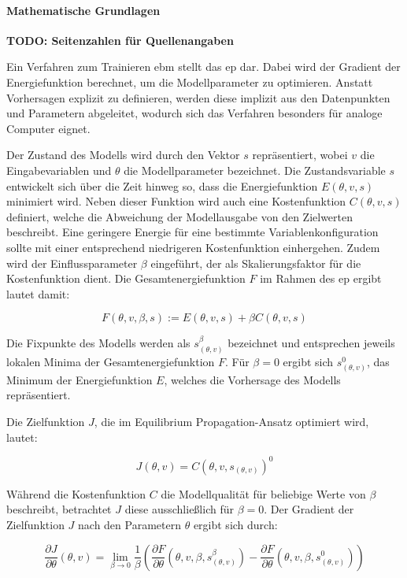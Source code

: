 \paragraph{Mathematische Grundlagen}

\textbf{TODO: Seitenzahlen für Quellenangaben}

Ein Verfahren zum Trainieren \ac{ebm} stellt das \ac{ep} dar. Dabei wird der Gradient der Energiefunktion berechnet, um die Modellparameter zu optimieren. Anstatt Vorhersagen explizit zu definieren, werden diese implizit aus den Datenpunkten und Parametern abgeleitet, wodurch sich das Verfahren besonders für analoge Computer eignet. \cite{Scellier2017}

Der Zustand des Modells wird durch den Vektor \(s\) repräsentiert, wobei \(v\) die Eingabevariablen und \(\theta\) die Modellparameter bezeichnet. Die Zustandsvariable \(s\) entwickelt sich über die Zeit hinweg so, dass die Energiefunktion \(E(\theta,v,s)\) minimiert wird. Neben dieser Funktion wird auch eine Kostenfunktion \(C(\theta,v,s)\) definiert, welche die Abweichung der Modellausgabe von den Zielwerten beschreibt. Eine geringere Energie für eine bestimmte Variablenkonfiguration sollte mit einer entsprechend niedrigeren Kostenfunktion einhergehen. Zudem wird der Einflussparameter \(\beta\) eingeführt, der als Skalierungsfaktor für die Kostenfunktion dient. Die Gesamtenergiefunktion \(F\) im Rahmen des \ac{ep} ergibt lautet damit:

\[F(\theta,v,\beta,s):=E(\theta,v,s)+\beta C(\theta,v,s)\]

Die Fixpunkte des Modells werden als \(s_{(\theta,v)}^\beta\) bezeichnet und entsprechen jeweils lokalen Minima der Gesamtenergiefunktion \(F\). Für \(\beta=0\) ergibt sich \(s_{(\theta,v)}^0\), das Minimum der Energiefunktion \(E\), welches die Vorhersage des Modells repräsentiert. \cite{Scellier2017}

Die Zielfunktion \(J\), die im Equilibrium Propagation-Ansatz optimiert wird, lautet:

\[J(\theta,v)=C(\theta,v,s_{(\theta,v)})^0\]

Während die Kostenfunktion \(C\) die Modellqualität für beliebige Werte von \(\beta\) beschreibt, betrachtet \(J\) diese ausschließlich für \(\beta=0\). Der Gradient der Zielfunktion \(J\) nach den Parametern \(\theta\) ergibt sich durch:

\[\frac{\partial J}{\partial \theta}(\theta,v)=\lim\limits_{\beta \to 0}\frac{1}{\beta}\left(\frac{\partial F}{\partial \theta}(\theta,v,\beta,s_{(\theta,v)}^\beta)-\frac{\partial F}{\partial \theta}(\theta,v,\beta,s_{(\theta,v)}^0)\right)\]

